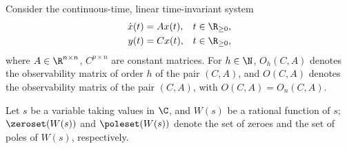 Consider the continuous-time, linear time-invariant system
\begin{align*}
  \dot{x}(t) &= Ax(t), & t\in\R_{\geq 0},\\
  y(t) &= Cx(t), & t\in\R_{\geq 0},
\end{align*}
where $A\in\R^{n \times n}$, $C^{p \times n}$ are constant matrices. For $h\in\N$, $O_h(C,A)$ denotes the observability matrix of order $h$ of the pair $(C,A)$, and $O(C,A)$ denotes the observability matrix of the pair $(C,A)$, with $O(C,A)=O_n(C,A)$.

Let $s$ be a variable taking values in $\C$, and $W(s)$ be a rational function of $s$; $\zeroset(W(s))$ and $\poleset(W(s))$ denote the set of zeroes and the set of poles of $W(s)$, respectively.
